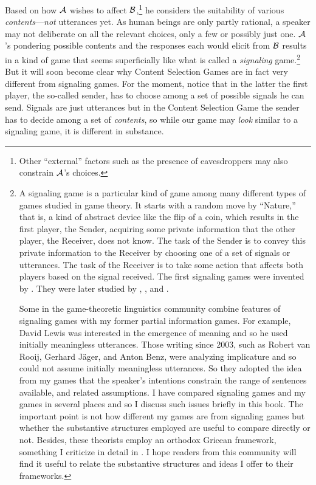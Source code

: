 Based on how $\cal A$ wishes to affect $\cal B$,\footnote{Other ``external'' factors such as the presence of eavesdroppers may also constrain $\cal A$'s choices.} he considers the suitability of various \emph{contents}---\emph{not} utterances yet. As human beings are only partly rational, a speaker may not deliberate on all the relevant choices, only a few or possibly just one. $\cal A$'s pondering possible contents and the responses each would elicit from $\cal B$ results in a kind of game that seems superficially like what is called a \emph{signaling} game.\footnote{A signaling game is a particular kind of game among many different types of games studied in game theory. It starts with a random move by ``Nature,'' that is, a kind of abstract device like the flip of a coin, which results in the first player, the Sender, acquiring some private information that the other player, the Receiver, does not know. The task of the Sender is to convey this private information to the Receiver by choosing one of a set of signals or utterances. The task of the Receiver is to take some action that affects both players based on the signal received. The first signaling games were invented by \citet{lewis:c}. They were later studied by \citet{spence:jms}, \citet{cs:sit}, and \citet{kreps:oeb}.

Some in the game-theoretic linguistics community combine features of signaling games with my former partial information games. For example, David Lewis was interested in the emergence of meaning and so he used initially meaningless utterances. Those writing since 2003, such as Robert van Rooij, Gerhard J\"{a}ger, and Anton Benz, were  analyzing implicature and so could not assume initially meaningless utterances. So they adopted the idea from my games that the speaker's intentions constrain the range of sentences available, and related assumptions. I have compared signaling games and my games in several places and so I discuss such issues briefly in this book. The important point is not how different my games are from signaling games but whether the substantive structures employed are useful to compare directly or not. Besides, these theorists employ an orthodox Gricean framework, something I criticize in detail in . I hope readers from this community will find it useful to relate the substantive structures and ideas I offer to their frameworks.} But it will soon become clear why Content Selection Games are in fact very different from signaling games. For the moment, notice that in the latter the first player, the so-called sender, has to choose among a set of possible signals he can send. Signals are just utterances but in the Content Selection Game the sender has to decide among a set of \emph{contents}, so while our game may \emph{look} similar to a signaling game, it is different in substance.

